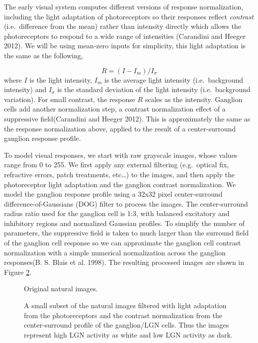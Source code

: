 \documentclass[
  sn-apa,
  pdflatex]{sn-jnl}
\theoremstyle{thmstyleone}%
\theoremstyle{thmstyletwo}%
\theoremstyle{thmstylethree}%
\begin{document}
The early visual system computes different versions of response
normalization, including the light adaptation of photoreceptors so their
responses reflect \emph{contrast} (i.e.~difference from the mean) rather
than intensity directly which allows the photoreceptors to respond to a
wide range of intensities (Carandini and Heeger 2012). We will be using
mean-zero inputs for simplicity, this light adaptation is the same as
the following,

\[
R = (I-I_m)/I_\sigma
\] where \(I\) is the light intensity, \(I_m\) is the average light
intensity (i.e.~background intensity) and \(I_\sigma\) is the standard
deviation of the light intensity (i.e.~background variation). For small
contrast, the response \(R\) scales as the intensity. Ganglion cells add
another normalization step, a contrast normalization effect of a
suppressive field(Carandini and Heeger 2012). This is approximately the
same as the response normalization above, applied to the result of a
center-surround ganglion response profile.

To model visual responses, we start with raw grayscale images, whose
values range from 0 to 255. We first apply any external filtering
(e.g.~optical fix, refractive errors, patch treatments, etc\ldots) to
the images, and then apply the photoreceptor light adaptation and the
ganglion contrast normalization. We model the ganglion response profile
using a 32x32 pixel center-surround difference-of-Gaussians (DOG) filter
to process the images. The center-surround radius ratio used for the
ganglion cell is 1:3, with balanced excitatory and inhibitory regions
and normalized Gaussian profiles. To simplify the number of parameters,
the suppressive field is taken to much larger than the surround field of
the ganglion cell response so we can approximate the ganglion cell
contrast normalization with a simple numerical normalization across the
ganglion responses(B. S. Blais et al. 1998). The resulting processed
images are shown in Figure \ref{fig:LGNresponses}.

\begin{figure}
\hypertarget{fig:orig}{%
\centering

\caption{Original natural images.}\label{fig:orig}
}
\end{figure}

\begin{figure}
\hypertarget{fig:LGNresponses}{%
\centering

\caption{A small subset of the natural images filtered with light
adaptation from the photoreceptors and the contrast normalization from
the center-surround profile of the ganglion/LGN cells. Thus the images
represent high LGN activity as white and low LGN activity as
dark.}\label{fig:LGNresponses}
}
\end{figure}
\end{document}
